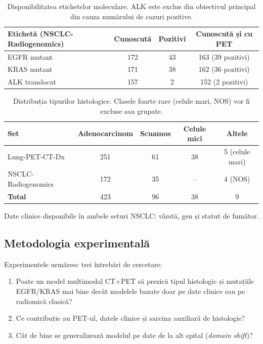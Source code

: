 \documentclass[11pt, a4paper]{article}
\begin{document}
\begin{table}[h]
\centering
\small
\begin{tabular}{@{}lccc@{}}
\toprule
\textbf{Etichetă (NSCLC-Radiogenomics)} & \textbf{Cunoscută} & \textbf{Pozitivi} & \textbf{Cunoscută și cu PET} \\ \midrule
EGFR mutant & 172 & 43 & 163 (39 pozitivi) \\
KRAS mutant & 171 & 38 & 162 (36 pozitivi) \\
ALK translocat & 157 & 2 & 152 (2 pozitivi) \\ \bottomrule
\end{tabular}
\caption{Disponibilitatea etichetelor moleculare. ALK este exclus din obiectivul principal din cauza numărului de cazuri pozitive.}
\end{table}

\begin{table}[h]
\centering
\small
\begin{tabular}{@{}lcccc@{}}
\toprule
\textbf{Set} & \textbf{Adenocarcinom} & \textbf{Scuamos} & \textbf{Celule mici} & \textbf{Altele} \\ \midrule
Lung-PET-CT-Dx & 251 & 61 & 38 & 5 (celule mari) \\
NSCLC-Radiogenomics & 172 & 35 & -- & 4 (NOS) \\ \midrule
\textbf{Total} & 423 & 96 & 38 & 9 \\ \bottomrule
\end{tabular}
\caption{Distribuția tipurilor histologice. Clasele foarte rare (celule mari, NOS) vor fi excluse sau grupate.}
\end{table}

Date clinice disponibile în ambele seturi NSCLC: vârstă, gen și statut de fumător.

\subsection{Metodologia experimentală}
Experimentele urmăresc trei întrebări de cercetare:
\begin{enumerate}
    \item Poate un model multimodal CT+PET să prezică tipul histologic și mutațiile EGFR/KRAS mai bine decât modelele bazate doar pe date clinice sau pe radiomică clasică?
    \item Ce contribuție au PET-ul, datele clinice și sarcina auxiliară de histologie?
    \item Cât de bine se generalizează modelul pe date de la alt spital (\textit{domain shift})?
\end{enumerate}
\end{document}
